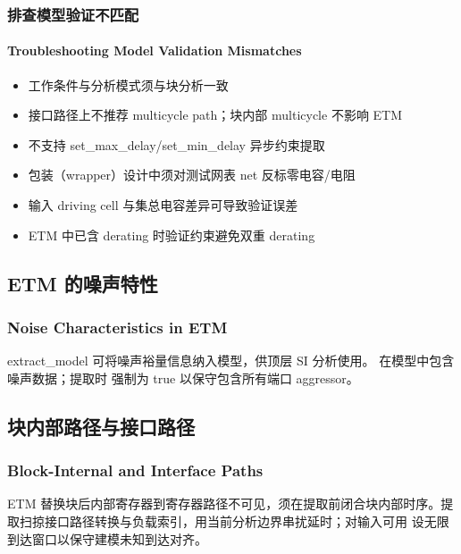 \subsubsection{排查模型验证不匹配}
\paragraph*{Troubleshooting Model Validation Mismatches}

\begin{itemize}
  \item 工作条件与分析模式须与块分析一致
  \item 接口路径上不推荐 multicycle path；块内部 multicycle 不影响 ETM
  \item 不支持 set_max_delay/set_min_delay 异步约束提取
  \item 包装（wrapper）设计中须对测试网表 net 反标零电容/电阻
  \item 输入 driving cell 与集总电容差异可导致验证误差
  \item ETM 中已含 derating 时验证约束避免双重 derating
\end{itemize}



\subsection{ETM 的噪声特性}
\subsubsection*{Noise Characteristics in ETM}

extract_model 可将噪声裕量信息纳入模型，供顶层 SI 分析使用。 在模型中包含噪声数据；提取时  强制为 true 以保守包含所有端口 aggressor。

\subsection{块内部路径与接口路径}
\subsubsection*{Block-Internal and Interface Paths}

ETM 替换块后内部寄存器到寄存器路径不可见，须在提取前闭合块内部时序。提取扫掠接口路径转换与负载索引，用当前分析边界串扰延时；对输入可用  设无限到达窗口以保守建模未知到达对齐。

